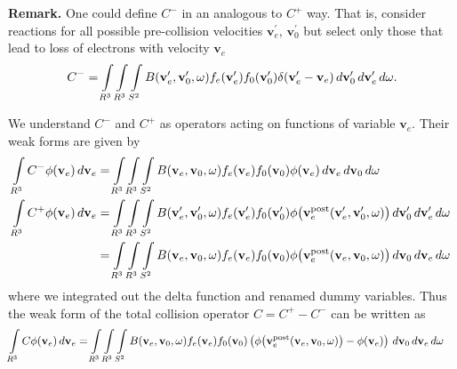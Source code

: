 \documentclass{article}
\newcommand{\myint}{\int\limits}
\newcommand{\diff}[1]{\, d#1}
\newcommand{\vect}[1]{\mathbf{#1}}
\newcommand{\of}[1]{\mleft( #1 \mright)}
\begin{document}
\textbf{Remark.} One could define $C^-$ in an analogous to $C^+$ way. That is, consider reactions for all possible pre-collision velocities $\vect{v}_e^\prime$, $\vect{v}_0^\prime$ but select only those that lead to loss of electrons with velocity $\vect{v}_e$
\begin{align*}
C^- = \myint_{R^3} \myint_{R^3} \myint_{S^2} 
B\of{\vect{v}_e^\prime, \vect{v}_0^\prime, \vect{\omega}} 
f_e\of{\vect{v}_e^\prime} f_0\of{\vect{v}_0^\prime} 
\delta\of{\vect{v}_e^\prime - \vect{v}_e} 
\diff{\vect{v}_0^\prime} \diff{\vect{v}_e^\prime} \diff{\vect{\omega}}.
\end{align*}

We understand $C^-$ and $C^+$ as operators acting on functions of variable $\vect{v}_e$. Their weak forms are given by
\begin{align*}
\myint_{R^3} C^- \phi\of{\vect{v}_e} \diff{\vect{v}_e} 
&=
\myint_{R^3} \myint_{R^3} \myint_{S^2} 
B\of{\vect{v}_e, \vect{v}_0, \vect{\omega}} 
f_e\of{\vect{v}_e} f_0\of{\vect{v}_0} 
\phi\of{\vect{v}_e} 
\diff{\vect{v}_e} \diff{\vect{v}_0} \diff{\vect{\omega}}
\\
\myint_{R^3} C^+ \phi\of{\vect{v}_e} \diff{\vect{v}_e} 
&= 
\myint_{R^3} \myint_{R^3} \myint_{S^2} 
B\of{\vect{v}_e^\prime, \vect{v}_0^\prime, \vect{\omega}} 
f_e\of{\vect{v}_e^\prime} f_0\of{\vect{v}_0^\prime} 
\phi\of{\vect{v}_e^\text{post}\of{\vect{v}_e^\prime, \vect{v}_0^\prime, \vect{\omega}}} 
\diff{\vect{v}_0^\prime} \diff{\vect{v}_e^\prime} \diff{\vect{\omega}}
\\
&= 
\myint_{R^3} \myint_{R^3} \myint_{S^2} 
B\of{\vect{v}_e, \vect{v}_0, \vect{\omega}} 
f_e\of{\vect{v}_e} f_0\of{\vect{v}_0} 
\phi\of{\vect{v}_e^\text{post}\of{\vect{v}_e, \vect{v}_0, \vect{\omega}}} 
\diff{\vect{v}_0} \diff{\vect{v}_e} \diff{\vect{\omega}}
\end{align*}
where we integrated out the delta function and renamed dummy variables. Thus the weak form of the total collision operator $C = C^+ - C^-$ can be written as 
\begin{align*}
\myint_{R^3} C \phi\of{\vect{v}_e} \diff{\vect{v}_e} 
&=
\myint_{R^3} \myint_{R^3} \myint_{S^2} 
B\of{\vect{v}_e, \vect{v}_0, \vect{\omega}} 
f_e\of{\vect{v}_e} f_0\of{\vect{v}_0} 
\left(
\phi\of{\vect{v}_e^\text{post}\of{\vect{v}_e, \vect{v}_0, \vect{\omega}}} 
- \phi\of{\vect{v}_e} 
\right)
\diff{\vect{v}_0} \diff{\vect{v}_e} \diff{\vect{\omega}}
\end{align*}
\end{document}
